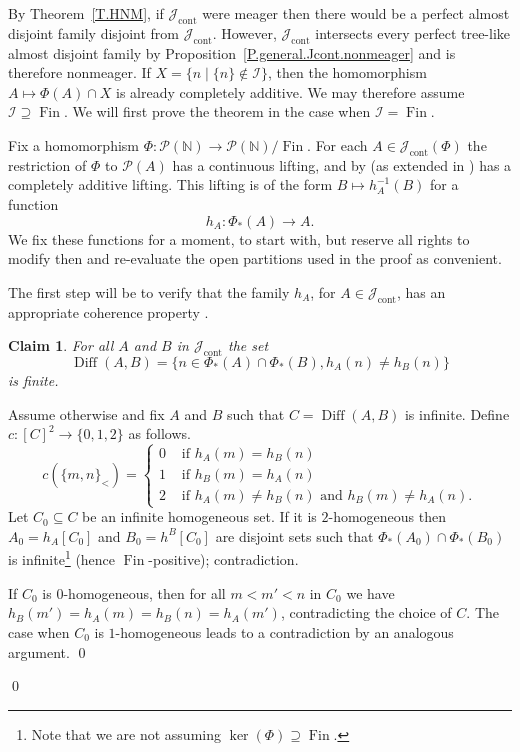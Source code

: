 \documentclass{amsart}
\makeatletter
\def\Fin{{\rm Fin}}   %
\def\text{\mbox}
\newtheorem{claim}{Claim}
\theoremstyle{definition}
\theoremstyle{remark}
\def\Fin{\operatorname{Fin}}
\DeclareMathOperator{\Ccont}{cont}
\newcommand{\Jcont}{\cJ_{\Ccont}}
\renewcommand{\proofname}{Proof}
\renewenvironment{proof}[1][\proofname]{\par
\let\oldqedsymbol\qedsymbol             %
  \normalfont
  \topsep6\p@\@plus6\p@ \trivlist
  \item[\hskip\labelsep\hskip\parindent\scshape
    #1\@addpunct{.}]\ignorespaces
}{%
  \qed\endtrivlist
\global\let\qedsymbol\oldqedsymbol      %
}
\newcommand{\cP}{\mathcal P}
\newcommand{\bbN}{\mathbb N}
\newcommand{\cI}{{\mathcal I}} %
\newcommand{\cJ}{{\mathcal J}} %
\DeclareMathOperator{\Diff}{Diff}
\numberwithin{claim}{subsection}
\makeatother
\begin{document}
\begin{proof}[Proof of Theorem~\ref{T.OCAsharp-Fin}]  By Theorem~\ref{T.HNM}, if $\Jcont$ were meager then there would be a perfect almost disjoint family disjoint from $\Jcont$. 
	However,  $\Jcont$ intersects every perfect  tree-like almost disjoint family by  Proposition~\ref{P.general.Jcont.nonmeager} and is therefore nonmeager.  If $X=\{n\mid \{n\}\notin \cI\}$, then the homomorphism $A\mapsto \Phi(A)\cap X$ is already completely additive. We may therefore assume $\cI\supseteq \Fin$. 
		We will first prove the theorem in the case when $\cI=\Fin$. 
	
	Fix a homomorphism $\Phi\colon \cP(\bbN)\to \cP(\bbN)/\Fin$. 
	For each $A\in  \Jcont(\Phi)$ the restriction of $\Phi$ to $\cP(A)$ has a continuous lifting, and by \cite{Ve:Definable} (as extended in \cite[Theorem~1.6.1]{Fa:AQ}) has a completely additive lifting. This lifting is of the form 
	$B\mapsto h_A^{-1}(B)$ for a function  
	\[
	h_A\colon \Phi_*(A)\to A. 
	\]
	We fix these functions for a moment, to start with, but reserve all rights to modify then and re-evaluate the open partitions used in the proof as convenient. 
	
	
	The first step will be to verify that the family $h_A$, for $A\in  \Jcont$, has an appropriate coherence property . 
	
	
	\begin{claim}\label{L.hA.coherent}
		For all $A$ and $B$ in $\Jcont$ the set 
		\[
		\Diff(A,B)=\{n\in \Phi_*(A)\cap\Phi_*(B), h_A(n)\neq h_B(n)\}
		\]
		is finite. 
	\end{claim}
	
	
	\begin{proof}  Assume otherwise and fix $A$ and $B$ such that $C=\Diff(A,B)$ is infinite. Define $c\colon [C]^2\to \{0,1,2\}$ as follows. 
		\[
		c(\{m,n\}_<)=
		\begin{cases}
			0& \text { if } h_A(m)=h_B(n)\\
			1& \text { if } h_B(m)=h_A(n)\\	
			2& \text { if } h_A(m)\neq h_B(n)\text{ and } h_B(m)\neq h_A(n).
		\end{cases}
		\]
		Let $C_0\subseteq C$ be an infinite homogeneous set. If it is $2$-homogeneous then $A_0=h_A[C_0]$ and $B_0=h^B[C_0]$ are disjoint sets such that $\Phi_*(A_0)\cap \Phi_*(B_0)$ is infinite\footnote{Note that we are not assuming $\ker(\Phi)\supseteq \Fin$.} (hence $\Fin$-positive); contradiction. 
		
		If $C_0$ is $0$-homogeneous, then for all $m< m'<n$ in $C_0$ we have $h_B(m')=h_A(m)=h_B(n)=h_A(m')$, contradicting the choice of $C$. The case when $C_0$ is $1$-homogeneous leads to a contradiction by an analogous argument. 
	\end{proof}
	

\end{proof}
\end{document}
